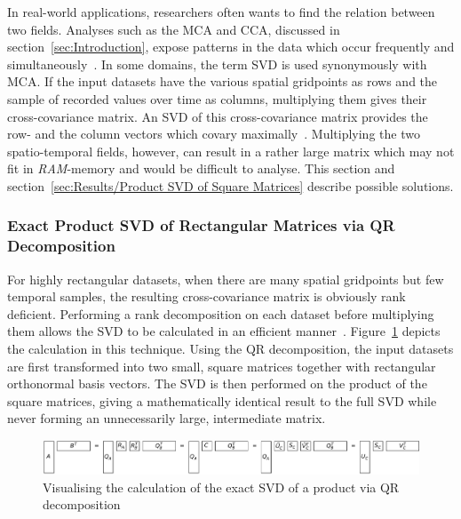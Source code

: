 \documentclass[ijgi,article,submit,moreauthors,pdftex,10pt,a4paper]{Definitions/mdpi}
\begin{document}
In real-world applications, researchers often wants to find the relation between two fields. Analyses such as the MCA and CCA, discussed in section~\ref{sec:Introduction}, expose patterns in the data which occur frequently and simultaneously~\cite{Eshel2011, Storch1999}. In some domains, the term SVD is used synonymously with MCA. If the input datasets have the various spatial gridpoints as rows and the sample of recorded values over time as columns, multiplying them gives their cross-covariance matrix. An SVD of this cross-covariance matrix provides the row- and the column vectors which covary maximally~\cite{Bretherton1992}. Multiplying the two spatio-temporal fields, however, can result in a rather large matrix which may not fit in \textit{RAM}-memory and would be difficult to analyse. This section and section~\ref{sec:Results/Product SVD of Square Matrices} describe possible solutions.

\subsubsection{Exact Product SVD of Rectangular Matrices via QR Decomposition}
\label{sec:Results/Exact Product SVD of Rectangular Matrices via QR Decomposition} %

For highly rectangular datasets, when there are many spatial gridpoints but few temporal samples, the resulting cross-covariance matrix is obviously rank deficient. Performing a rank decomposition on each dataset before multiplying them allows the SVD to be calculated in an efficient manner~\cite{Chan1982, Tygert2017}. Figure~\ref{fig:qrProductSVD} depicts the calculation in this technique. Using the QR decomposition, the input datasets are first transformed into two small, square matrices together with rectangular orthonormal basis vectors. The SVD is then performed on the product of the square matrices, giving a mathematically identical result to the full SVD while never forming an unnecessarily large, intermediate matrix.

\begin{figure}[H]
\centering
\includegraphics[width=\textwidth]{Results/qrProductSVD.pdf}
\caption[Exact SVD via QR decomposition]{Visualising the calculation of the exact SVD of a product via QR decomposition}
\label{fig:qrProductSVD}
\end{figure}
\end{document}
